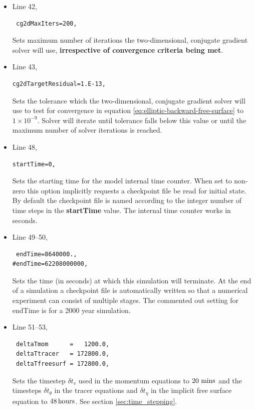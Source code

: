 {\begin{itemize}
\item Line 42,
\begin{verbatim}
 cg2dMaxIters=200,
\end{verbatim}
  Sets maximum number of iterations the two-dimensional, conjugate
  gradient solver will use, {\bf irrespective of convergence 
    criteria being met}.\\

\item Line 43,
\begin{verbatim}
cg2dTargetResidual=1.E-13,
\end{verbatim}
  Sets the tolerance which the two-dimensional, conjugate
  gradient solver will use to test for convergence in equation 
  \ref{eq:elliptic-backward-free-surface} %
  to $1 \times 10^{-9}$.
  Solver will iterate until tolerance falls below this value or until the 
  maximum number of solver iterations is reached.\\

\item Line 48,
\begin{verbatim}
startTime=0,
\end{verbatim}
Sets the starting time for the model internal time counter.
When set to non-zero this option implicitly requests a 
checkpoint file be read for initial state.
By default the checkpoint file is named according to
the integer number of time steps in the {\bf startTime} value.
The internal time counter works in seconds.

\item Line 49--50,
\begin{verbatim}
 endTime=8640000.,
#endTime=62208000000,
\end{verbatim}
  Sets the time (in seconds) at which this simulation will terminate.
  At the end of a simulation a checkpoint file is automatically
  written so that a numerical experiment can consist of multiple
  stages.  The commented out setting for endTime is for a 2000 year
  simulation.

\item Line 51--53,
\begin{verbatim}
 deltaTmom      =   1200.0,
 deltaTtracer   = 172800.0,
 deltaTfreesurf = 172800.0,
\end{verbatim}
  Sets the timestep $\delta t_{v}$ used in the momentum equations to
  $20~{\rm mins}$ and the timesteps $\delta t_{\theta}$ in the tracer
  equations and $\delta t_{\eta}$ in the implicit free surface
  equation to $48\mbox{\,hours}$.
  See section \ref{sec:time_stepping}.%
  \\


\end{itemize}}
